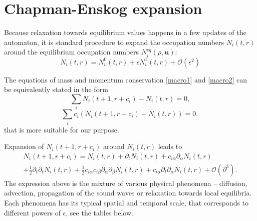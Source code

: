 
\section{Chapman-Enskog expansion}
Because relaxation towards equilibrium values happens in a few updates of the automaton, it is standard procedure to expand the occupation numbers $N_i(t,r)$ around the equilibrium occupation numbers $N_i^{eq}(\rho,\bm{u})$:
\begin{equation} \label{chap}
N_i(t,r) = N_i^0(t,r) + \epsilon N_i^1(t,r) + \mathcal{O}(\epsilon^2) 
\end{equation} 


The equations of mass and momentum conservation \ref{macro1} and \ref{macro2} can be equivalently stated in the form
\begin{equation} \label{macro_m}
\sum_i N_i(t+1,r+c_i) - N_i(t,r) = 0 ,
\end{equation}
\begin{equation} \label{macro_p}
\sum_i c_i (N_i(t+1,r+c_i) - N_i(t,r)) = 0,
\end{equation}
that is more suitable for our purpose.

Expansion of $N_i(t+1,r+c_i)$ around $N_i(t,r)$ leads to
\begin{equation} \label{rozvoj t+1}
\begin{split}
N_i(t+1,r+c_i) = N_i(t,r) + \partial_t N_i(t,r) + c_{i\alpha} \partial_{\alpha} N_i(t,r) \\ 
+ \frac{1}{2} \partial_t \partial_t N_i(t,r) + \frac{1}{2} c_{i\alpha}c_{i\beta} \partial_{\alpha} \partial_{\beta} N_i(t,r) + c_{i\alpha} \partial_t \partial_{\alpha} N_i(t,r) + \mathcal{O}(\partial^3).
\end{split}
\end{equation}
\bigskip
The expression above is the mixture of various physical phenomena -- diffusion, advection, propagation of the sound waves or relaxation towards local equilibria. Each phenomena has its typical spatial and temporal scale, that corresponds to different powers of $\epsilon$, see the tables below. %


